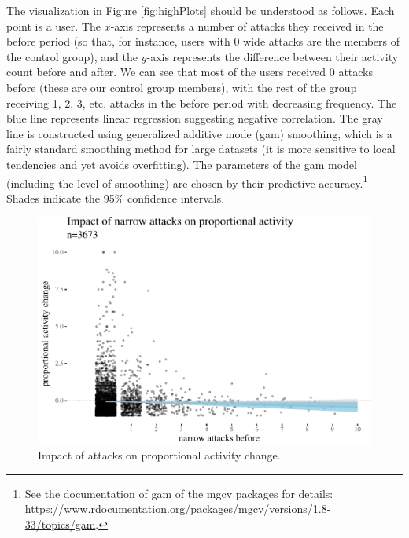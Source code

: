 \documentclass[a4paper,fleqn]{cas-dc}
\begin{document}
The visualization in Figure \ref{fig:highPlots} should be understood as follows. Each point is a user. The $x$-axis represents a number of attacks they received in the \textsf{before} period (so that, for instance, users with 0 wide attacks are the members of the control group), and  the $y$-axis represents the difference between their activity count \textsf{before} and \textsf{after}. We can see that most of the users received 0 attacks before (these are our control group members), with the rest of the group receiving 1, 2, 3, etc. attacks in the \textsf{before} period with decreasing frequency. The blue line represents linear regression suggesting negative correlation. The gray line is constructed using generalized additive mode (gam) smoothing, which is  a fairly standard smoothing method for large datasets (it is more sensitive to local tendencies and yet avoids overfitting). The parameters of the gam model (including the level of smoothing) are chosen by their predictive accuracy.\footnote{See  the documentation of \textsf{gam} of the \textsf{mgcv} packages for details: \url{https://www.rdocumentation.org/packages/mgcv/versions/1.8-33/topics/gam}.}  Shades indicate the 95\% confidence  intervals.






\begin{figure}[H]
\begin{center}\includegraphics[width=1\linewidth]{images/unnamed-chunk-6-1} 
\end{center}
\caption{Impact of attacks  on proportional activity change.}
\label{fig:propActivity}
\end{figure}
\end{document}
